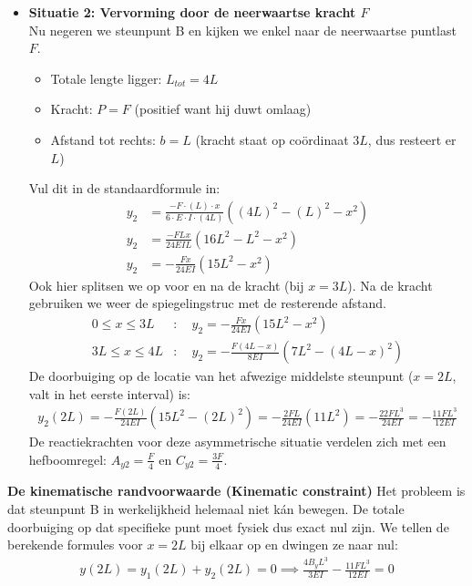 \documentclass[a4paper,11pt,twoside]{report}
\begin{document}
\begin{itemize}
    \item \textbf{Situatie 2: Vervorming door de neerwaartse kracht $F$}\\
          Nu negeren we steunpunt B en kijken we enkel naar de neerwaartse puntlast $F$.
          \begin{itemize}
              \item Totale lengte ligger: $L_{tot} = 4L$
              \item Kracht: $P = F$ (positief want hij duwt omlaag)
              \item Afstand tot rechts: $b = L$ (kracht staat op coördinaat $3L$, dus resteert er $L$)
          \end{itemize}
          Vul dit in de standaardformule in:
          \begin{align*}
              y_2 & = \frac{-F \cdot (L) \cdot x}{6 \cdot E \cdot I \cdot (4L)} \left((4L)^2 - (L)^2 - x^2\right) \\
              y_2 & = \frac{-F L x}{24 E I L} \left(16L^2 - L^2 - x^2\right)                                      \\
              y_2 & = -\frac{Fx}{24EI} \left(15L^2 - x^2\right)
          \end{align*}
          Ook hier splitsen we op voor en na de kracht (bij $x=3L$). Na de kracht gebruiken we weer de
          spiegelingstruc met de resterende afstand.
          \begin{align*}
              0 \le x \le 3L  & : \quad y_2 = -\frac{Fx}{24EI}(15L^2 - x^2)             \\
              3L \le x \le 4L & : \quad y_2 = -\frac{F(4L - x)}{8EI}(7L^2 - (4L - x)^2)
          \end{align*}
          De doorbuiging op de locatie van het afwezige middelste steunpunt ($x = 2L$, valt in het eerste
          interval) is:
          \begin{align*}
              y_2(2L) = -\frac{F(2L)}{24EI}(15L^2 - (2L)^2) = -\frac{2FL}{24EI}(11L^2) = -\frac{22FL^3}{24EI} = -\frac{11FL^3}{12EI}
          \end{align*}
          De reactiekrachten voor deze asymmetrische situatie verdelen zich met een hefboomregel:
          $A_{y2} = \frac{F}{4}$ en $C_{y2} = \frac{3F}{4}$.
\end{itemize}

\textbf{De kinematische randvoorwaarde (Kinematic constraint)} \newline
Het probleem is dat steunpunt B in werkelijkheid helemaal niet kán bewegen. De totale doorbuiging op
dat specifieke punt moet fysiek dus exact nul zijn. We tellen de berekende formules voor $x=2L$ bij
elkaar op en dwingen ze naar nul:
\begin{align*}
    y(2L) = y_1(2L) + y_2(2L) = 0 \implies \frac{4B_y L^3}{3EI} - \frac{11FL^3}{12EI} = 0
\end{align*}
\end{document}
